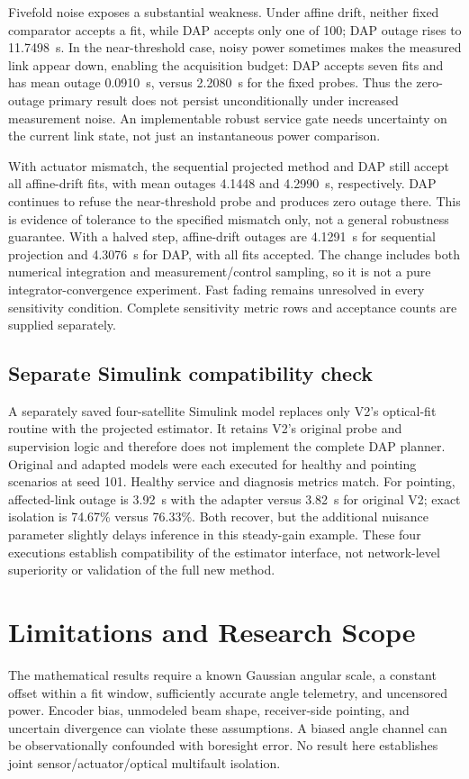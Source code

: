 \documentclass[journal]{IEEEtran}
\begin{document}
Fivefold noise exposes a substantial weakness. Under affine drift, neither fixed comparator accepts a fit, while DAP accepts only one of 100; DAP outage rises to 11.7498~s. In the near-threshold case, noisy power sometimes makes the measured link appear down, enabling the acquisition budget: DAP accepts seven fits and has mean outage 0.0910~s, versus 2.2080~s for the fixed probes. Thus the zero-outage primary result does not persist unconditionally under increased measurement noise. An implementable robust service gate needs uncertainty on the current link state, not just an instantaneous power comparison.

With actuator mismatch, the sequential projected method and DAP still accept all affine-drift fits, with mean outages 4.1448 and 4.2990~s, respectively. DAP continues to refuse the near-threshold probe and produces zero outage there. This is evidence of tolerance to the specified mismatch only, not a general robustness guarantee. With a halved step, affine-drift outages are 4.1291~s for sequential projection and 4.3076~s for DAP, with all fits accepted. The change includes both numerical integration and measurement/control sampling, so it is not a pure integrator-convergence experiment. Fast fading remains unresolved in every sensitivity condition. Complete sensitivity metric rows and acceptance counts are supplied separately.

\subsection{Separate Simulink compatibility check}
A separately saved four-satellite Simulink model replaces only V2's optical-fit routine with the projected estimator. It retains V2's original probe and supervision logic and therefore does not implement the complete DAP planner. Original and adapted models were each executed for healthy and pointing scenarios at seed 101. Healthy service and diagnosis metrics match. For pointing, affected-link outage is 3.92~s with the adapter versus 3.82~s for original V2; exact isolation is 74.67\% versus 76.33\%. Both recover, but the additional nuisance parameter slightly delays inference in this steady-gain example. These four executions establish compatibility of the estimator interface, not network-level superiority or validation of the full new method.

\section{Limitations and Research Scope}
The mathematical results require a known Gaussian angular scale, a constant offset within a fit window, sufficiently accurate angle telemetry, and uncensored power. Encoder bias, unmodeled beam shape, receiver-side pointing, and uncertain divergence can violate these assumptions. A biased angle channel can be observationally confounded with boresight error. No result here establishes joint sensor/actuator/optical multifault isolation.
\end{document}
